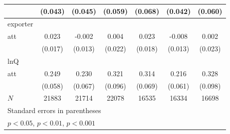 {\begin{tabular}{l*{6}{c}}
            &     (0.043)         &     (0.045)         &     (0.059)         &     (0.068)         &     (0.042)         &     (0.060)         \\
\hline
exporter    &                     &                     &                     &                     &                     &                     \\
att         &       0.023         &      -0.002         &       0.004         &       0.023         &      -0.008         &       0.002         \\
            &     (0.017)         &     (0.013)         &     (0.022)         &     (0.018)         &     (0.013)         &     (0.023)         \\
\hline
lnQ         &                     &                     &                     &                     &                     &                     \\
att         &       0.249\sym{***}&       0.230\sym{***}&       0.321\sym{***}&       0.314\sym{***}&       0.216\sym{***}&       0.328\sym{***}\\
            &     (0.058)         &     (0.067)         &     (0.096)         &     (0.069)         &     (0.061)         &     (0.098)         \\
\hline
\(N\)       &       21883         &       21714         &       22078         &       16535         &       16334         &       16698         \\
\hline\hline
\multicolumn{7}{l}{\footnotesize Standard errors in parentheses}\\
\multicolumn{7}{l}{\footnotesize \sym{*} \(p<0.05\), \sym{**} \(p<0.01\), \sym{***} \(p<0.001\)}\\
\end{tabular}
}
